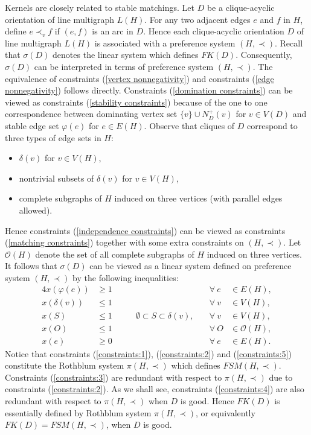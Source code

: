 \documentclass[11pt]{article}
\numberwithin{theorem}{section}
\begin{document}
Kernels are closely related to stable matchings. Let $D$ be a clique-acyclic orientation of line multigraph $L(H)$. 
For any two adjacent edges $e$ and $f$ in $H$, define $e\prec_v f$ if $(e,f)$ is an arc in $D$. 
Hence each clique-acyclic orientation $D$ of line multigraph $L(H)$ is associated with a preference system $(H,\prec)$.
Recall that $\sigma(D)$ denotes the linear system which defines $FK(D)$. Consequently, $\sigma(D)$ can be interpreted in terms of preference system $(H,\prec)$. The equivalence of constraints (\ref{vertex nonnegativity}) and constraints (\ref{edge nonnegativity}) follows directly. Constraints (\ref{domination constraints}) can be viewed as constraints (\ref{stability constraints}) because of the one to one correspondence between dominating vertex set $\{v\}\cup N^+_D(v)$ for $v\in V(D)$ and stable edge set $\varphi(e)$ for $e\in E(H)$.
Observe that cliques of $D$ correspond to three types of edge sets in $H$:
\begin{itemize}
\item $\delta(v)$ for $v\in V(H)$,
\item nontrivial subsets of $\delta(v)$ for $v\in V(H)$,
\item complete subgraphs of $H$ induced on three vertices (with parallel edges allowed).
\end{itemize}
Hence constraints (\ref{independence constraints}) can be viewed as constraints (\ref{matching constraints}) together with some extra constraints on $(H,\prec)$. Let $\mathcal{O}(H)$ denote the set of all complete subgraphs of $H$ induced on three vertices. It follows that $\sigma(D)$ can be viewed as a linear system defined on preference system $(H,\prec)$ by the following inequalities:
\begin{alignat}{4}
x(\varphi(e)) &\geq 1 &\qquad &\forall ~e &\in E(H),\label{constraints:1}\\
x(\delta(v)) &\leq 1 &\qquad &\forall ~v &\in V(H),\label{constraints:2}\\
x(S) &\leq 1 &\qquad \emptyset\subset S\subset \delta(v),\quad &\forall ~v&\in V(H),\label{constraints:3}\\
x(O) &\leq 1 &\qquad &\forall ~O&\in \mathcal{O}(H),\label{constraints:4}\\
x(e) &\geq 0 &\qquad &\forall ~e &\in E(H)\label{constraints:5}.
\end{alignat}
Notice that constraints (\ref{constraints:1}), (\ref{constraints:2}) and (\ref{constraints:5}) constitute the Rothblum system $\pi(H,\prec)$ which defines $FSM(H,\prec)$. Constraints (\ref{constraints:3}) are redundant with respect to $\pi(H,\prec)$ due to constraints (\ref{constraints:2}). As we shall see, constraints (\ref{constraints:4}) are also redundant with respect to $\pi(H,\prec)$ when $D$ is good. Hence $FK(D)$ is essentially defined by Rothblum system $\pi(H,\prec)$, or equivalently $FK(D)=FSM(H,\prec)$, when $D$ is good.
\end{document}
